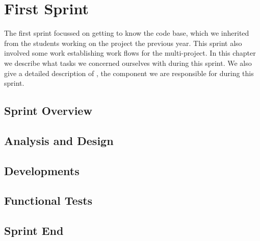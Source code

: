 \chapter{First Sprint}\label{chap:sprint1}
The first sprint focussed on getting to know the \giraf code base, which we inherited from the students working on the project the previous year. 
This sprint also involved some work establishing work flows for the multi-project. 
In this chapter we describe what tasks we concerned ourselves with during this sprint. 
We also give a detailed description of \launcher, the component we are responsible for during this sprint.

\section{Sprint Overview}\label{sec:sprint1:overview}


\section{Analysis and Design}\label{sec:sprint1:analysis}




\section{Developments}\label{sec:sprint1:developments}


%




\section{Functional Tests}\label{sec:sprint1:testing}



\section{Sprint End}\label{sec:sprint1:review}
